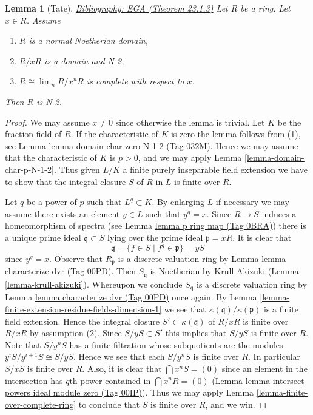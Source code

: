 \documentclass{amsart}
\newenvironment{reference}{\comment}{\endcomment}
\theoremstyle{plain}
\newtheorem{lemma}[subsection]{Lemma}
\theoremstyle{definition}
\theoremstyle{remark}
\numberwithin{equation}{subsection}
\def\lim{\mathop{\mathrm{lim}}\nolimits}
\begin{document}
\begin{lemma}[Tate]
\label{lemma-tate-japanese}
\begin{reference}
\href{https://stacks.math.columbia.edu/bibliography}{Bibliography: EGA (Theorem 23.1.3)}
\end{reference}
Let $R$ be a ring.
Let $x \in R$.
Assume
\begin{enumerate}
\item $R$ is a normal Noetherian domain,
\item $R/xR$ is a domain and N-2,
\item $R \cong \lim_n R/x^nR$ is complete with respect to $x$.
\end{enumerate}
Then $R$ is N-2.
\end{lemma}

\begin{proof}
We may assume $x \not = 0$ since otherwise the lemma is trivial.
Let $K$ be the fraction field of $R$. If the characteristic of $K$
is zero the lemma follows from (1), see
Lemma \href{https://stacks.math.columbia.edu/tag/032M}{lemma domain char zero N 1 2 (Tag 032M)}. Hence we may assume
that the characteristic of $K$ is $p > 0$, and we may apply
Lemma \ref{lemma-domain-char-p-N-1-2}. Thus given $L/K$
a finite purely inseparable field extension we have to show
that the integral closure $S$ of $R$ in $L$ is finite over $R$.

\medskip\noindent
Let $q$ be a power of $p$ such that $L^q \subset K$.
By enlarging $L$ if necessary we may assume there exists
an element $y \in L$ such that $y^q = x$. Since $R \to S$
induces a homeomorphism of spectra (see Lemma \href{https://stacks.math.columbia.edu/tag/0BRA}{lemma p ring map (Tag 0BRA)})
there is a unique prime ideal $\mathfrak q \subset S$ lying
over the prime ideal $\mathfrak p = xR$. It is clear that
$$
\mathfrak q = \{f \in S \mid f^q \in \mathfrak p\} = yS
$$
since $y^q = x$. Observe that $R_{\mathfrak p}$ is a discrete
valuation ring by Lemma \href{https://stacks.math.columbia.edu/tag/00PD}{lemma characterize dvr (Tag 00PD)}. Then
$S_{\mathfrak q}$ is Noetherian by Krull-Akizuki
(Lemma \ref{lemma-krull-akizuki}). Whereupon we conclude
$S_{\mathfrak q}$ is a discrete valuation ring by
Lemma \href{https://stacks.math.columbia.edu/tag/00PD}{lemma characterize dvr (Tag 00PD)} once again.
By Lemma \ref{lemma-finite-extension-residue-fields-dimension-1} we
see that $\kappa(\mathfrak q)/\kappa(\mathfrak p)$ is
a finite field extension. Hence the integral closure
$S' \subset \kappa(\mathfrak q)$ of $R/xR$ is finite over
$R/xR$ by assumption (2). Since $S/yS \subset S'$ this implies
that $S/yS$ is finite over $R$. Note that $S/y^nS$ has a finite
filtration whose subquotients are the modules
$y^iS/y^{i + 1}S \cong S/yS$. Hence we see that each $S/y^nS$
is finite over $R$. In particular $S/xS$ is finite over $R$.
Also, it is clear that $\bigcap x^nS = (0)$ since an element
in the intersection has $q$th power contained in $\bigcap x^nR = (0)$
(Lemma \href{https://stacks.math.columbia.edu/tag/00IP}{lemma intersect powers ideal module zero (Tag 00IP)}).
Thus we may apply Lemma \ref{lemma-finite-over-complete-ring} to conclude
that $S$ is finite over $R$, and we win.
\end{proof}
\end{document}
